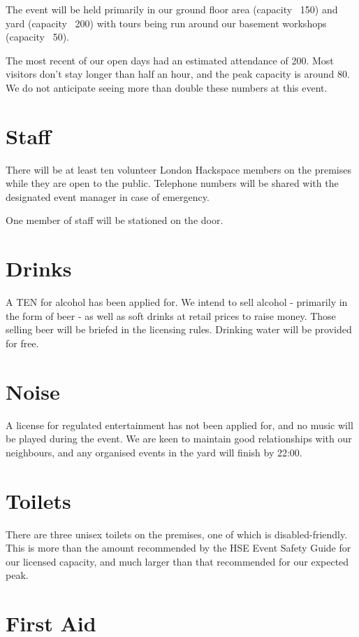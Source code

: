 The event will be held primarily in our ground floor area (capacity ~150) and yard
(capacity ~200) with tours being run around our basement workshops (capacity ~50).

The most recent of our open days had an estimated attendance of 200. Most visitors
don't stay longer than half an hour, and the peak capacity is around 80. We do not
anticipate seeing more than double these numbers at this event.

\section{Staff}

There will be at least ten volunteer London Hackspace members on the premises while
they are open to the public. Telephone numbers will be shared with the designated
event manager in case of emergency.

One member of staff will be stationed on the door.

\section{Drinks}

A TEN for alcohol has been applied for. We intend to sell alcohol - primarily in the
form of beer - as well as soft drinks at retail prices to raise money. Those selling
beer will be briefed in the licensing rules. Drinking water will be provided for free.

\section{Noise}

A license for regulated entertainment has not been applied for, and no music will be
played during the event. We are keen to maintain good relationships with our neighbours,
and any organised events in the yard will finish by 22:00.

\section{Toilets}

There are three unisex toilets on the premises, one of which is disabled-friendly.
This is more than the amount recommended by the HSE Event Safety Guide for
our licensed capacity, and much larger than that recommended for our expected peak.

\section{First Aid}

